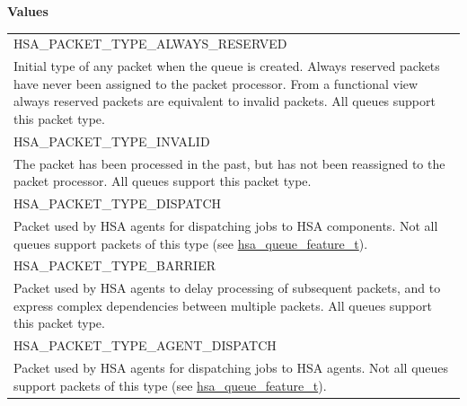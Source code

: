 \documentclass[final]{book}
\newcommand{\reftyp}[1]{#1}
\newcommand{\refenu}[1]{\reftyp{#1}}
\begin{document}
\noindent\textbf{Values}\\[-5mm]
\begin{longtable}{@{\hspace{2em}}p{\linewidth-2em}}
\hspace{-2em}\refenu{HSA_\-PACKET_\-TYPE_\-ALWAYS_\-RESERVED}\\Initial type of any packet when the queue is created. Always reserved packets have never been assigned to the packet processor. From a functional view always reserved packets are equivalent to invalid packets. All queues support this packet type.\\[2mm]
\hspace{-2em}\refenu{HSA_\-PACKET_\-TYPE_\-INVALID}\\The packet has been processed in the past, but has not been reassigned to the packet processor. All queues support this packet type.\\[2mm]
\hspace{-2em}\refenu{HSA_\-PACKET_\-TYPE_\-DISPATCH}\\Packet used by HSA agents for dispatching jobs to HSA components. Not all queues support packets of this type (see \hyperlink{group__queue_1ga1145b01f6d9e2670179a22c92db39413}{hsa_\-queue_\-feature_\-t}).\\[2mm]
\hspace{-2em}\refenu{HSA_\-PACKET_\-TYPE_\-BARRIER}\\Packet used by HSA agents to delay processing of subsequent packets, and to express complex dependencies between multiple packets. All queues support this packet type.\\[2mm]
\hspace{-2em}\refenu{HSA_\-PACKET_\-TYPE_\-AGENT_\-DISPATCH}\\Packet used by HSA agents for dispatching jobs to HSA agents. Not all queues support packets of this type (see \hyperlink{group__queue_1ga1145b01f6d9e2670179a22c92db39413}{hsa_\-queue_\-feature_\-t}).
\end{longtable}
\end{document}
